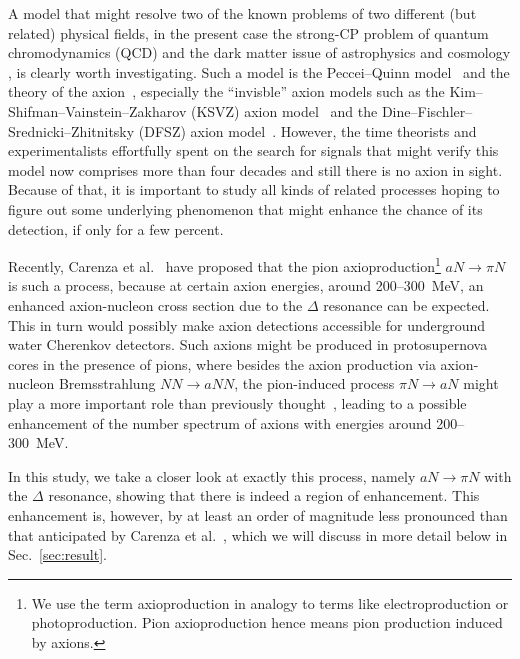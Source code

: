 \documentclass[reprint,amssymb,amsmath,floatfix,aps,prd,groupedaddress,nofootinbib]{revtex4-2}
\begin{document}
A model that might resolve two of the known problems of two different (but related) physical fields, in the present 
case the strong-CP problem of quantum chromodynamics (QCD) and the dark matter issue of astrophysics and cosmology
\cite{Preskill:1982cy,Abbott:1982af,Dine:1982ah,Ipser:1983mw,Turner:1986tb,Duffy:2009ig,Marsh:2015xka}, is clearly
worth investigating. Such a model is the Peccei--Quinn model~\cite{Peccei:1977hh,Peccei:1977ur} and the theory
of the axion~\cite{Weinberg:1977ma,Wilczek:1977pj},  especially the ``invisble'' axion models such as the
Kim--Shifman--Vainstein--Zakharov (KSVZ) axion model~\cite{Kim:1979if,Shifman:1979if} and the
Dine--Fischler--Srednicki--Zhitnitsky (DFSZ) axion model~\cite{Dine:1981rt,Zhitnitsky:1980tq}. However,
the time theorists and experimentalists effortfully spent on the search for signals that might verify this
model now comprises more than four decades and still there is no axion in sight. Because of that, it is important
to study all kinds of related processes hoping to figure out some underlying phenomenon that might enhance
the chance of its detection, if only for a few percent.

Recently, Carenza et al.~\cite{Carenza:2020cis} have proposed that the pion axioproduction\footnote{We use the term axioproduction in analogy to terms like electroproduction or photoproduction. Pion axioproduction hence means pion production induced by axions.} $aN\to \pi N$ is such a process, 
because at certain axion energies, around 200--300~MeV, an enhanced axion-nucleon cross section due to the $\Delta$ resonance
can be expected. This in turn would possibly make axion detections accessible for underground water Cherenkov
detectors. Such axions might be produced in protosupernova cores in the presence of pions, where besides
the axion production via axion-nucleon Bremsstrahlung $NN\to aNN$, the pion-induced process $ \pi N \to aN$
might play a more important role than previously thought~\cite{Carenza:2020cis,Fischer:2021jfm}, leading to a possible enhancement of the number spectrum of axions with energies around 200--300~MeV. 

In this study, we take a closer look at exactly this process, namely $aN\to \pi N$ with the $\Delta$ resonance, showing
that there is indeed a region of enhancement. This enhancement is, however, by at least an order of magnitude
less pronounced than that anticipated by Carenza et al.~\cite{Carenza:2020cis}, which we will discuss in more detail
below in Sec.~\ref{sec:result}.
\end{document}
